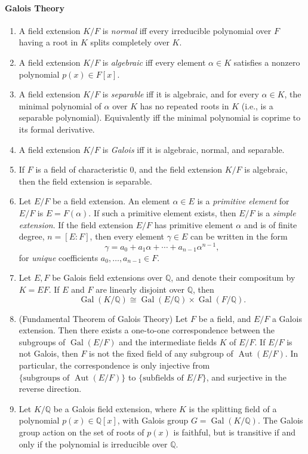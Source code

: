 \documentclass{article}
\begin{document}
	\paragraph{Galois Theory}
	\begin{enumerate}[resume = algebra]
		\item A field extension $K/F$ is \textit{normal} iff every irreducible polynomial over $F$ having a root in $K$ splits completely over $K$. 
		\item A field extension $K/F$ is \textit{algebraic} iff every element $\alpha \in K$ satisfies a nonzero polynomial $p(x) \in F[x]$. 
		\item A field extension $K/F$ is \textit{separable} iff it is algebraic, and for every $\alpha \in K$, the minimal polynomial of $\alpha$ over $K$ has no repeated roots in $K$ (i.e., is a separable polynomial). Equivalently iff the minimal polynomial is coprime to its formal derivative. 
		\item A field extension $K/F$ is \textit{Galois} iff it is algebraic, normal, and separable. 
		\item If $F$ is a field of characteristic 0, and the field extension $K/F$ is algebraic, then the field extension is separable.
		\item Let $E/F$ be a field extension. An element $\alpha \in E$ is a \textit{primitive element} for $E/F$ is $E = F(\alpha)$. If such a primitive element exists, then $E/F$ is a \textit{simple extension}. If the field extension $E/F$ has primitive element $\alpha$ and is of finite degree, $n = [E:F]$, then every element $\gamma \in E$ can be written in the form 
		\begin{equation*}
			\gamma = a_{0} + a_{1}\alpha + \dotsm + a_{n-1}\alpha^{n-1},  
		\end{equation*}
		for \textit{unique} coefficients $a_{0}, \ldots, a_{n-1} \in F$. 
		\item Let $E, F$ be Galois field extensions over $\mathbb{Q}$, and denote their compositum by $K = EF$. If $E$ and $F$ are linearly disjoint over $\mathbb{Q}$, then 
		\begin{equation*}
			\operatorname{Gal}(K/\mathbb{Q}) \cong \operatorname{Gal}(E/\mathbb{Q}) \times\operatorname{Gal}(F/\mathbb{Q}). 
		\end{equation*}
		\item (Fundamental Theorem of Galois Theory) Let $F$ be a field, and $E/F$ a Galois extension. Then there exists a one-to-one correspondence between the subgroups of $\operatorname{Gal}(E/F)$ and the intermediate fields $K$ of $E/F$. If $E/F$ is not  Galois, then $F$ is not the fixed field of any subgroup of $\operatorname{Aut}(E/F)$. In particular, the correspondence is only injective from $\{\text{subgroups of $\operatorname{Aut}(E/F)$}\}$ to $\{\text{subfields of $E/F$}\}$, and surjective in the reverse direction. 
		\item Let $K/\mathbb{Q}$ be a Galois field extension, where $K$ is the splitting field of a polynomial $p(x)\in \mathbb{Q}[x]$, with Galois group $G = \operatorname{Gal}(K/\mathbb{Q})$. The Galois group action on the set of roots of $p(x)$ is faithful, but is transitive if and only if the polynomial is irreducible over $\mathbb{Q}$.  
	\end{enumerate}
\end{document}
